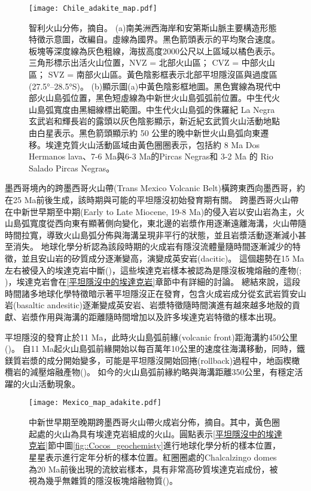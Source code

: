 \begin{figure*}[ht!]
    \centering
    \texttt{[image: Chile\_adakite\_map.pdf]}
    \caption[智利火山分佈，摘自\citealp{goss2009extreme}]{智利火山分佈，摘自\citealp{goss2009extreme}。
    (a)南美洲西海岸和安第斯山脈主要構造形態特徵示意圖，改編自\citealp{lamb2003cenozoic}。虛線為國界。黑色箭頭表示\citealp{demets1990current}的平均聚合速度。板塊等深度線為灰色粗線，海拔高度2000公尺以上區域以橘色表示。三角形標示出活火山位置，NVZ = 北部火山區； CVZ = 中部火山區； SVZ = 南部火山區。黃色陰影框表示北部平坦隱沒區與過度區(27.5°–28.5°S)。
    (b)顯示圖(a)中黃色陰影框地圖。黑色實線為現代中部火山島弧位置，黑色短虛線為中新世火山島弧弧前位置。中生代火山島弧寬度由黑細線標出範圍。中生代火山島弧的侏羅紀 La Negra 玄武岩和輝長岩的露頭以灰色陰影顯示，新近紀玄武質火山活動地點由白星表示。黑色箭頭顯示約 50 公里的晚中新世火山島弧向東遷移。埃達克質火山活動區域由黃色圈圈表示，包括約 8 Ma Dos Hermanos lava、7-6 Ma與6-3 Ma的Pircas Negras和 3-2 Ma 的 Rio Salado Pircas Negras。
    }
    \label{fig::Chile_adakite_map}
\end{figure*}


墨西哥境內的跨墨西哥火山帶(Trans Mexico Volcanic Belt)橫跨東西向墨西哥，約在25 Ma前後生成，該時期與可能的平坦隱沒初始發育期有關。
跨墨西哥火山帶在中新世早期至中期(Early to Late Miocene, 19-8 Ma)的侵入岩以安山岩為主，火山島弧寬度從西向東有顯著側向變化，東北邊的岩漿作用逐漸遠離海溝，火山帶隨時間拉寬，導致火山島弧分佈與海溝呈現非平行的狀態，並且岩漿活動逐漸減小甚至消失。
地球化學分析認為該段時期的火成岩有隱沒流體量隨時間逐漸減少的特徵，並且安山岩的矽質成分逐漸變高，演變成英安岩(dacitic)。
這個趨勢在15 Ma左右被侵入的埃達克岩中斷(\citealp{mori2007effects})，這些埃達克岩樣本被認為是隱沒板塊熔融的產物(\citealp{gomez2003temporal}; \citealp{mori2007effects})，埃達克岩會在\ref{平坦隱沒中的埃達克岩}章節中有詳細的討論。
總結來說，這段時間諸多地球化學特徵暗示著平坦隱沒正在發育，包含火成岩成分從玄武岩質安山岩(basaltic andesitic)逐漸變成英安岩、岩漿特徵隨時間演進有越來越多地殼的貢獻、岩漿作用與海溝的距離隨時間增加以及許多埃達克岩特徵的樣本出現。

平坦隱沒的發育止於11 Ma，此時火山島弧前緣(volcanic front)距海溝約450公里(\citealp{Manea2011Thermal})。
自11 Ma起火山島弧前緣開始以每百萬年10公里的速度往海溝移動，同時，鐵鎂質岩漿的成分開始變多，可能是平坦隱沒開始回捲(rollback)過程中，地函楔橄欖岩的減壓熔融產物(\citealp{gomez2003temporal})。
如今的火山島弧前緣約略與海溝距離350公里，有穩定活躍的火山活動現象。

\begin{figure*}[ht!]
    \centering
    \texttt{[image: Mexico\_map\_adakite.pdf]}
    \caption[中新世早期至晚期跨墨西哥火山帶火成岩分佈，摘自\citealp{ferrari2012dynamic}]{中新世早期至晚期跨墨西哥火山帶火成岩分佈，摘自\citealp{ferrari2012dynamic}。其中，黃色圈起處的火山為具有埃達克岩組成的火山。圓點表示\ref{平坦隱沒中的埃達克岩}節中圖\ref{fig::Cocos_geochemisty}進行地球化學分析的樣本位置，星星表示進行定年分析的樣本位置。紅圈圈處的Chalcalzingo domes為20 Ma前後出現的流紋岩樣本，具有非常高矽質埃達克岩成份，被視為幾乎無雜質的隱沒板塊熔融物質(\citealp{gomez2008origin})。
    }
    \label{fig::Mexico_adakite_map}
\end{figure*}